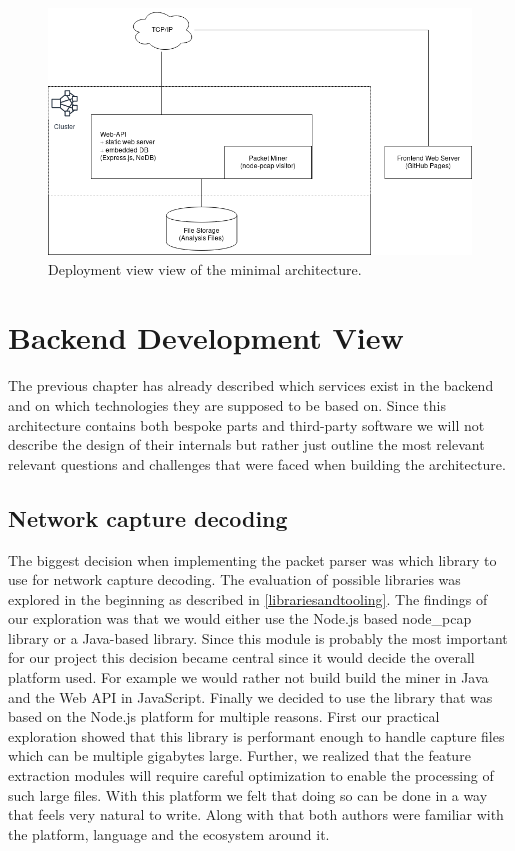 \begin{figure}
    \centering
    \includegraphics[width=16cm]{images/deploymentviewmvp.png}
    \caption{Deployment view view of the minimal architecture.}
    \label{fig:deploymentviewmvp}
\end{figure}

\section{Backend Development View}
The previous chapter has already described which services exist in the backend and on which technologies they are supposed to be based on. Since this architecture contains both bespoke parts and third-party software we will not describe the design of their internals but rather just outline the most relevant relevant questions and challenges that were faced when building the architecture.

\subsection{Network capture decoding}\label{networkcapturedecoding}
The biggest decision when implementing the packet parser was which library to use for network capture decoding. The evaluation of possible libraries was explored in the beginning as described in \ref{librariesandtooling}. The findings of our exploration was that we would either use the Node.js based node\_pcap library or a Java-based library. Since this module is probably the most important for our project this decision became central since it would decide the overall platform used. For example we would rather not build build the miner in Java and the Web API in JavaScript.
Finally we decided to use the library that was based on the Node.js platform for multiple reasons. First our practical exploration showed that this library is performant enough to handle capture files which can be multiple gigabytes large. Further, we realized that the feature extraction modules will require careful optimization to enable the processing of such large files. With this platform we felt that doing so can be done in a way that feels very natural to write. Along with that both authors were familiar with the platform, language and the ecosystem around it.

